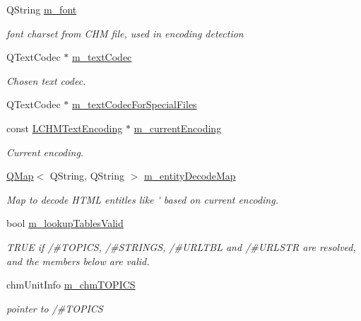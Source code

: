 \begin{DoxyCompactItemize}
Q\+String \hyperlink{classLCHMFileImpl_a2b0d1d5b99fef328aa6a8f2c7ba7a495}{m\+\_\+font}
\begin{DoxyCompactList}\small\item\em font charset from C\+H\+M file, used in encoding detection \end{DoxyCompactList}\item 
Q\+Text\+Codec $\ast$ \hyperlink{classLCHMFileImpl_a2f941b3f26a4f845d3e785cfad0eeb58}{m\+\_\+text\+Codec}
\begin{DoxyCompactList}\small\item\em Chosen text codec. \end{DoxyCompactList}\item 
Q\+Text\+Codec $\ast$ \hyperlink{classLCHMFileImpl_ad50032706377cebb647d43f348904942}{m\+\_\+text\+Codec\+For\+Special\+Files}
\item 
const \hyperlink{structLCHMTextEncoding}{L\+C\+H\+M\+Text\+Encoding} $\ast$ \hyperlink{classLCHMFileImpl_a365b502e727dd2202dec204815d23c50}{m\+\_\+current\+Encoding}
\begin{DoxyCompactList}\small\item\em Current encoding. \end{DoxyCompactList}\item 
\hyperlink{classQMap}{Q\+Map}$<$ Q\+String, Q\+String $>$ \hyperlink{classLCHMFileImpl_ae00b1b33fde26e719bc22207c11e589f}{m\+\_\+entity\+Decode\+Map}
\begin{DoxyCompactList}\small\item\em Map to decode H\+T\+M\+L entitles like \'{} based on current encoding. \end{DoxyCompactList}\item 
bool \hyperlink{classLCHMFileImpl_a1bd04b8772eaa2e3dd91bda8c4553f90}{m\+\_\+lookup\+Tables\+Valid}
\begin{DoxyCompactList}\small\item\em T\+R\+U\+E if /\#\+T\+O\+P\+I\+C\+S, /\#\+S\+T\+R\+I\+N\+G\+S, /\#\+U\+R\+L\+T\+B\+L and /\#\+U\+R\+L\+S\+T\+R are resolved, and the members below are valid. \end{DoxyCompactList}\item 
chm\+Unit\+Info \hyperlink{classLCHMFileImpl_ae4a2d92d948b4482781b6b539ff1dd75}{m\+\_\+chm\+T\+O\+P\+I\+C\+S}
\begin{DoxyCompactList}\small\item\em pointer to /\#\+T\+O\+P\+I\+C\+S \end{DoxyCompactList}\item 

\end{DoxyCompactItemize}
